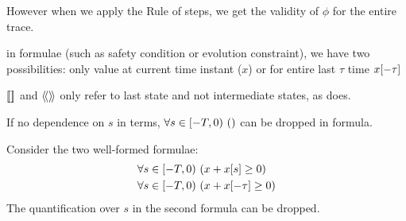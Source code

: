     However when we apply the Rule of steps, we get the validity of $\phi$ for the entire trace.

    in formulae (such as safety condition or evolution constraint), we have two possibilities: only value at current time instant ($x$) or for entire last $\tau$ time $x[-\tau]$

    $\dbox{}{}$ and $\ddiamond{}{}$ only refer to last state and not intermediate states, as \dTL does.


    

    If no dependence on $s$ in terms, $\forall s\in[-T,0){\,} \left(\right)$ can be dropped in formula.

    \begin{example}
        Consider the two well-formed \ddL formulae:
        \begin{align*}
            &\forall s\in[-T,0){\,} \left(x+x[s]\geq 0\right)\\
            &\forall s\in[-T,0){\,} \left(x+x[-\tau]\geq 0\right) 
        \end{align*}
        The quantification over $s$ in the second formula can be dropped.
    \end{example}

